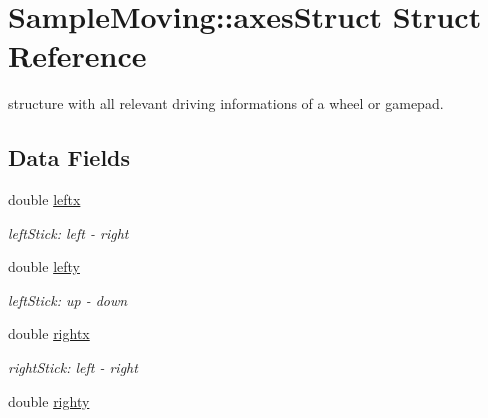 \hypertarget{structSampleMoving_1_1axesStruct}{\section{Sample\-Moving\-:\-:axes\-Struct Struct Reference}
\label{structSampleMoving_1_1axesStruct}
}


structure with all relevant driving informations of a wheel or gamepad.  


\subsection*{Data Fields}
\begin{DoxyCompactItemize}
\item 
\hypertarget{structSampleMoving_1_1axesStruct_a2d482db7cc14da7bb724aa4d5d8963f1}{double \hyperlink{structSampleMoving_1_1axesStruct_a2d482db7cc14da7bb724aa4d5d8963f1}{leftx}}\label{structSampleMoving_1_1axesStruct_a2d482db7cc14da7bb724aa4d5d8963f1}

\begin{DoxyCompactList}\small\item\em left\-Stick\-: left -\/ right \end{DoxyCompactList}\item 
\hypertarget{structSampleMoving_1_1axesStruct_abe4b6e7cd32103116d03bb94037a9b2b}{double \hyperlink{structSampleMoving_1_1axesStruct_abe4b6e7cd32103116d03bb94037a9b2b}{lefty}}\label{structSampleMoving_1_1axesStruct_abe4b6e7cd32103116d03bb94037a9b2b}

\begin{DoxyCompactList}\small\item\em left\-Stick\-: up -\/ down \end{DoxyCompactList}\item 
\hypertarget{structSampleMoving_1_1axesStruct_a3996511566eef5e419c4f3d2517c6292}{double \hyperlink{structSampleMoving_1_1axesStruct_a3996511566eef5e419c4f3d2517c6292}{rightx}}\label{structSampleMoving_1_1axesStruct_a3996511566eef5e419c4f3d2517c6292}

\begin{DoxyCompactList}\small\item\em right\-Stick\-: left -\/ right \end{DoxyCompactList}\item 
\hypertarget{structSampleMoving_1_1axesStruct_a6458238beaa33918583f8e988c8b7fe4}{double \hyperlink{structSampleMoving_1_1axesStruct_a6458238beaa33918583f8e988c8b7fe4}{righty}}\label{structSampleMoving_1_1axesStruct_a6458238beaa33918583f8e988c8b7fe4}


\end{DoxyCompactItemize}
